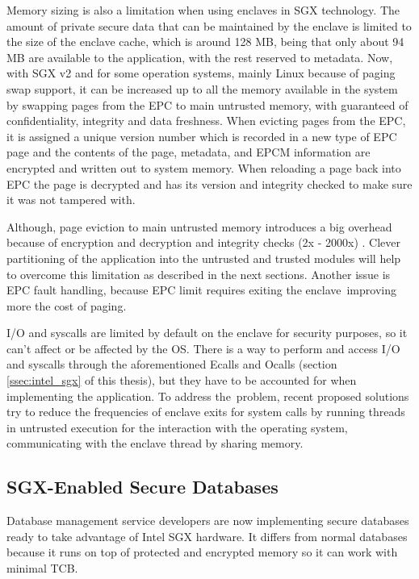 Memory sizing is also a limitation when using enclaves in \gls{SGX} technology. The amount of private secure data that can be maintained by the enclave is limited to the size of the enclave cache, which is around 128 \gls{MB}, being that only about 94 \gls{MB} are available to the application, with the rest reserved to metadata. Now, with \gls{SGX} v2 and for some operation systems, mainly Linux because of paging swap support, it can be increased up to all the memory available in the system \cite{sgx:1} by swapping pages from the \gls{EPC} to main untrusted memory, with guaranteed of confidentiality, integrity and data freshness. When evicting pages from the \gls{EPC}, it is assigned a unique version number which is recorded in a new type of \gls{EPC} page and the contents of the page, metadata, and \gls{EPCM} information are encrypted and written out to system memory. When reloading a page back into \gls{EPC} the page is decrypted and has its version and integrity checked to make sure it was not tampered with.

Although, page eviction to main untrusted memory introduces a big overhead because of encryption and decryption and integrity checks (2x - 2000x) \cite{scone:1}. Clever partitioning of the application into the untrusted and trusted modules will help to overcome this limitation as described in the next sections. Another issue is \gls{EPC} fault handling, because \gls{EPC} limit requires exiting the enclave improving more the cost of paging.

\gls{I/O} and \glspl{syscall} are limited by default on the enclave for security purposes, so it can't affect or be affected by the \gls{OS}. There is a way to perform and access \gls{I/O} and \glspl{syscall} through the aforementioned \glspl{Ecall} and \glspl{Ocall} (section \ref{ssec:intel_sgx} of this thesis), but they have to be accounted for when implementing the application. To address the problem, recent proposed solutions try to reduce the frequencies of enclave exits for system calls by running threads in untrusted execution for the interaction with the operating system, communicating with the enclave thread by sharing memory.

\subsection{SGX-Enabled Secure Databases}
\label{ssec:sgx_enabled_secure_databases}

Database management service developers are now implementing secure databases ready to take advantage of Intel \gls{SGX} hardware. It differs from normal databases because it runs on top of protected and encrypted memory so it can work with minimal \gls{TCB}.

